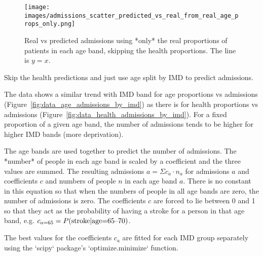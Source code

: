 \documentclass[12pt]{extarticle}
\begin{document}
\begin{figure}
    \centering
    \texttt{[image: images/admissions\_scatter\_predicted\_vs\_real\_from\_real\_age\_props\_only.png]}
    \caption{Real vs predicted admissions using *only* the real proportions of patients in each age band, skipping the health proportions. The line is $y=x$.}
    \label{fig:admissions_predicted_from_real_age_props_only}
\end{figure}

Skip the health predictions and just use age split by IMD to predict admissions.



The data shows a similar trend with IMD band for age proportions vs admissions (Figure~\ref{fig:data_age_admissions_by_imd}) as there is for health proportions vs admissions (Figure~\ref{fig:data_health_admissions_by_imd}).
For a fixed proportion of a given age band, the number of admissions tends to be higher for higher IMD bands (more deprivation).


The age bands are used together to predict the number of admissions.
The *number* of people in each age band is scaled by a coefficient and the three values are summed.
The resulting admissions $a = \Sigma c_a \cdot n_a$ for admissions $a$ and coefficients $c$ and numbers of people $n$ in each age band $a$.
There is no constant in this equation so that when the numbers of people in all age bands are zero, the number of admissions is zero.
The coefficients $c$ are forced to lie between 0 and 1 so that they act as the probability of having a stroke for a person in that age band, e.g. $c_{a=65} = P(\textnormal{stroke} | \textnormal{age=65--70})$.

The best values for the coefficients $c_a$ are fitted for each IMD group separately using the `scipy` package's `optimize.minimize` function.
\end{document}
